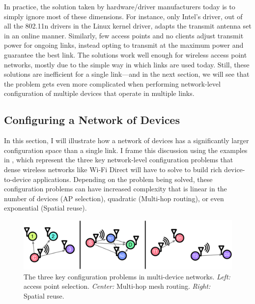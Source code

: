 In practice, the solution taken by hardware/driver manufacturers today is to simply ignore most of these dimensions. For instance, only Intel's  driver, out of all the 802.11n drivers in the Linux kernel driver, adapts the transmit antenna set in an online manner. Similarly, few access points and no clients adjust transmit power for ongoing links, instead opting to transmit at the maximum power and guarantee the best link. The solutions work well enough for wireless access point networks, mostly due to the simple way in which links are used today. Still, these solutions are inefficient for a single link---and in the next section, we will see that the problem gets even more complicated when performing network-level configuration of multiple devices that operate in multiple links.

\subsection{Configuring a Network of Devices}
\label{sec:intro_network_problems}
In this section, I will illustrate how a network of devices has a significantly larger configuration space than a single link. I frame this discussion using the examples in , which represent the three key network-level configuration problems that dense wireless networks like Wi-Fi Direct will have to solve to build rich device-to-device applications. Depending on the problem being solved, these configuration problems can have increased complexity that is linear in the number of devices (AP selection), quadratic (Multi-hop routing), or even exponential (Spatial reuse).

\begin{figure}[tp]
	\centering
	\includegraphics[width=\textwidth]{figures/network}
	\caption[The three key configuration problems in multi-device networks]{\label{fig:network_examples} The three key configuration problems in multi-device networks. \textit{Left:} access point selection. \textit{Center:} Multi-hop mesh routing. \textit{Right:} Spatial reuse. }
\end{figure}

